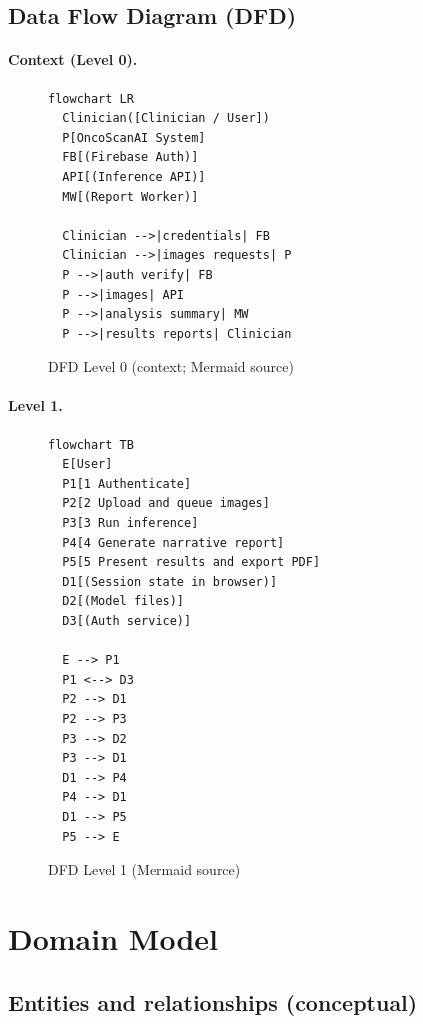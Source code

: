 \documentclass[12pt,a4paper]{report}
\begin{document}
\subsection{Data Flow Diagram (DFD)}
\label{sec:dfd}

\paragraph{Context (Level 0).}

\begin{figure}[htbp]
  \centering
  \begin{verbatim}
flowchart LR
  Clinician([Clinician / User])
  P[OncoScanAI System]
  FB[(Firebase Auth)]
  API[(Inference API)]
  MW[(Report Worker)]

  Clinician -->|credentials| FB
  Clinician -->|images requests| P
  P -->|auth verify| FB
  P -->|images| API
  P -->|analysis summary| MW
  P -->|results reports| Clinician
  \end{verbatim}
  \caption{DFD Level 0 (context; Mermaid source)}
\end{figure}

\paragraph{Level 1.}

\begin{figure}[htbp]
  \centering
  \begin{verbatim}
flowchart TB
  E[User]
  P1[1 Authenticate]
  P2[2 Upload and queue images]
  P3[3 Run inference]
  P4[4 Generate narrative report]
  P5[5 Present results and export PDF]
  D1[(Session state in browser)]
  D2[(Model files)]
  D3[(Auth service)]

  E --> P1
  P1 <--> D3
  P2 --> D1
  P2 --> P3
  P3 --> D2
  P3 --> D1
  D1 --> P4
  P4 --> D1
  D1 --> P5
  P5 --> E
  \end{verbatim}
  \caption{DFD Level 1 (Mermaid source)}
\end{figure}

\section{Domain Model}
\label{sec:domain}

\subsection{Entities and relationships (conceptual)}
\end{document}
